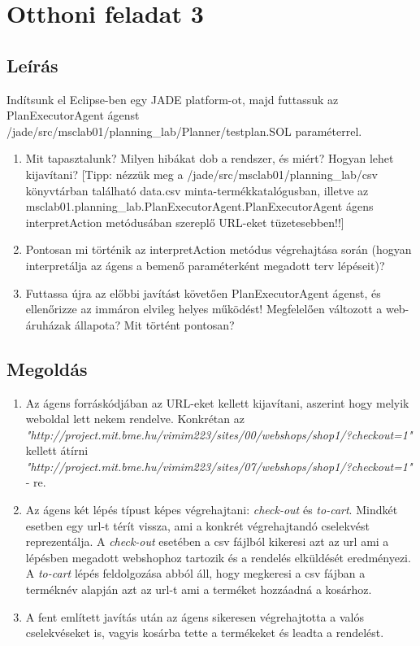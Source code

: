 \section{Otthoni feladat 3}
\subsection{Leírás}
Indítsunk el Eclipse-ben egy JADE platform-ot, majd futtassuk az PlanExecutorAgent ágenst /jade/src/msclab01/planning\_lab/Planner/testplan.SOL paraméterrel. 
\begin{enumerate}
\item Mit tapasztalunk? Milyen hibákat dob a rendszer, és miért? Hogyan lehet kijavítani? [Tipp: nézzük meg a /jade/src/msclab01/planning\_lab/csv könyvtárban található data.csv minta-termékkatalógusban, illetve az msclab01.planning\_lab.PlanExecutorAgent.PlanExecutorAgent ágens interpretAction metódusában szereplő URL-eket tüzetesebben!!] 
\item Pontosan mi történik az interpretAction metódus végrehajtása során (hogyan interpretálja az ágens a bemenő paraméterként megadott terv lépéseit)? 
\item Futtassa újra az előbbi javítást követően PlanExecutorAgent ágenst, és ellenőrizze az immáron elvileg helyes működést! Megfelelően változott a web-áruházak állapota? Mit történt pontosan?  
\end{enumerate} 
\subsection{Megoldás}
\begin{enumerate}
\item Az ágens forráskódjában az URL-eket kellett kijavítani, aszerint hogy melyik weboldal lett nekem rendelve. Konkrétan az \emph{"http://project.mit.bme.hu/vimim223/sites/00/webshops/shop1/?checkout=1"} kellett átírni \emph{"http://project.mit.bme.hu/vimim223/sites/07/webshops/shop1/?checkout=1"} - re.
\item Az ágens két lépés típust képes végrehajtani: \emph{check-out} és \emph{to-cart}. Mindkét esetben egy url-t térít vissza, ami a konkrét végrehajtandó cselekvést reprezentálja. A \emph{check-out} esetében a csv fájlból kikeresi azt az url ami a lépésben megadott webshophoz tartozik és a rendelés elküldését eredményezi. A \emph{to-cart} lépés feldolgozása abból áll, hogy megkeresi a csv fájban a terméknév alapján azt az url-t ami a terméket hozzáadná a kosárhoz.
\item A fent említett javítás után az ágens sikeresen végrehajtotta a valós cselekvéseket is, vagyis kosárba tette a termékeket és leadta a rendelést.
\end{enumerate} 
